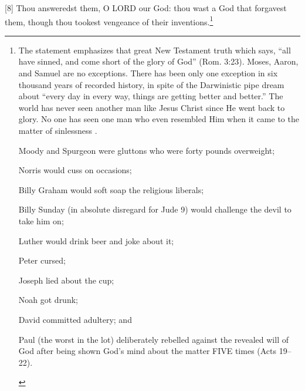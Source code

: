 [8] \textcolor[rgb]{0.00,0.00,1.00}{Thou answeredst them, O LORD our God: thou wast a God that forgavest them, though thou tookest vengeance of their inventions.}\footnote{The statement emphasizes that great New Testament truth which says, ``all have sinned, and come short of the glory of God'' (Rom. 3:23). Moses, Aaron, and Samuel are no exceptions. There has been only one exception in six thousand years of recorded history, in spite of the Darwinistic pipe dream about ``every day in every way, things are getting better and better.'' The world has never seen another man like Jesus Christ since He went back to glory. No one has seen one man who even resembled Him when it came to the matter of sinlessness \cite{Ruckman1992psalms}. 
\begin{compactenum}
\item Moody and Spurgeon were gluttons who were forty pounds overweight; 
\item Norris would cuss on occasions; 
\item Billy Graham would soft soap the religious liberals; 
\item Billy Sunday (in absolute disregard for Jude 9) would challenge the devil to take him on; 
\item Luther would drink beer and joke about it; 
\item Peter cursed; 
\item Joseph lied about the cup; 
\item Noah got drunk; 
\item David committed adultery; and 
\item Paul (the worst in the lot) deliberately rebelled against the revealed will of God after being shown God's mind about the matter FIVE times (Acts 19--22). 

\end{compactenum}}
